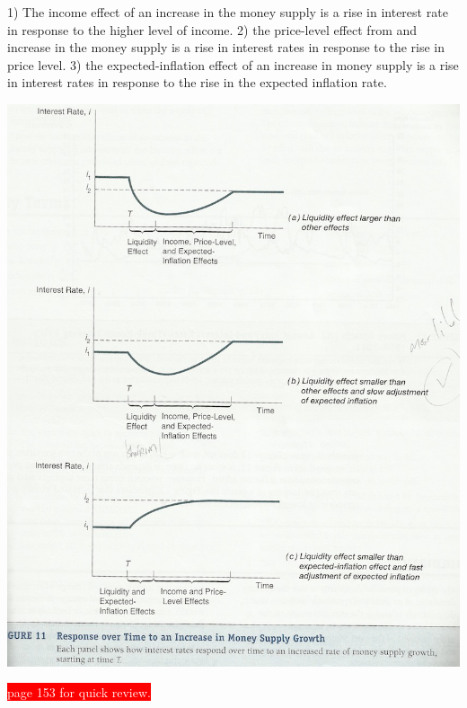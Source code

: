 \documentclass[12pt]{examnotes}
\begin{document}
1) The income effect of an increase in the money supply is a rise in interest rate in response to the higher level of income.
2) the price-level effect from and increase in the money supply is a rise in interest rates in response to the rise in price level.
3) the expected-inflation effect of an increase in money supply is a rise in interest rates in response to the rise in the expected inflation rate.

\begin{center}
  \includegraphics[scale=0.5]{./imgs/c5f11.jpg}
\end{center}
\colorbox{red}{\textcolor{white}{page 153 for quick review.}}

\end{document}
